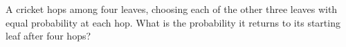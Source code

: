 A cricket hops among four leaves, choosing each of the other three leaves with equal probability at each hop. What is the probability it returns to its starting leaf after four hops?
